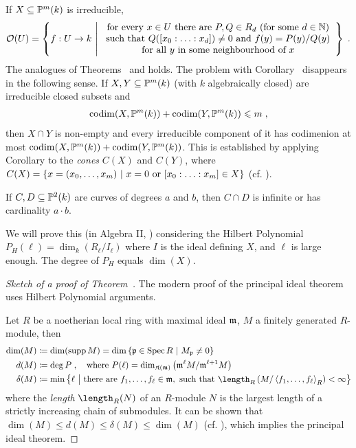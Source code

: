 \documentclass[a4paper,parskip=half,numbers=enddot, DIV=12]{scrreprt}
\renewcommand{\leq}{\leqslant}
\begin{document}
	If $X\subseteq \mathbb{P}^m(k)$ is irreducible,
	\begin{align*}
		\mathcal{O}(U) = \left\{f: U\to k\ \middle|\  
		\begin{array}{c}
			\text{for every } x\in U \text{ there are } P, Q\in R_d \text{ (for some }d\in\mathbb{N})\\
			\text{such that } Q([x_0:\ldots:x_d]) \not=0\text{ and }f(y)=P(y)/Q(y)  \\
			 \text{for all }y\text{ in some neighbourhood of } x
		\end{array}\right\}\;.
	\end{align*}
	The analogues of Theorems~ and  holds. The problem with Corollary~ disappears in the following sense. If $X,Y\subseteq \mathbb{P}^m(k)$ (with $k$ algebraically closed) are irreducible closed subsets and 
	\begin{align*}
		\codim(X,\IP^m(k))+\codim(Y,\IP^m(k)) \leq m\;, 
	\end{align*}
	then $X\cap Y$ is non-empty and every irreducible component of it has codimenion at most $\operatorname{codim}(X,\mathbb{P}^m(k)) +\operatorname{codim}(Y,\mathbb{P}^m(k))$. This is established by applying Corollary  to the \emph{cones} $C(X)$ and $C(Y)$, where $C(X) = \left\{x=(x_0,\ldots,x_m) \ \middle|\  x= 0\text{ or }[x_0:\ldots:x_m]\in X\right\}$ (cf. \cite[Theorem~16]{alg2}).
	\begin{thm}[Bezout]
		If $C,D\subseteq \mathbb{P}^2(k)$ are curves of degrees $a$ and $b$, then $C\cap D$ is infinite or has cardinality $a\cdot b$.
	\end{thm}
	We will prove this (in Algebra II, \cite[Theorem~19]{alg2}) considering the Hilbert Polynomial $P_H(\ell) = \dim_k (R_\ell/I_\ell)$ where $I$ is the ideal defining $X$, and $\ell$ is large enough. The degree of $P_H$ equals $\dim (X)$.
	
	\begin{proof}[Sketch of a proof of Theorem~]
		The modern proof of the principal ideal theorem uses Hilbert Polynomial arguments.
		
		Let $R$ be a noetherian local ring with maximal ideal $\mathfrak{m}$, $M$ a finitely generated $R$-module, then
		\begin{align*}
		\dim (M)&\coloneqq  \dim( \operatorname{supp} M) = \dim \left\{\pp\in \Spec R\st M_\pp\neq 0\right\}\\
		d(M) &\coloneqq \deg P\;,\quad\text{where }  P(\ell)=  \dim_{\KK(\mm)} \left(\mm^\ell M /\mm^{\ell+1}M\right)\\
		\delta(M) &\coloneqq \min\big\{\ell\ \big|\ \text{there are } f_1,\ldots,f_\ell\in \mm, \text{ such that } \length_R\left(M/\left\langle f_1,\ldots,f_\ell\right\rangle_R\right)<\infty\big\}
		\end{align*}
		where the \emph{length} $\length_R(N)$ of an $R$-module $N$ is the largest length of a strictly increasing chain of submodules. It can be shown that $\dim (M) \leq d(M)\leq  \delta(M)\leq \dim (M)$ (cf. \cite[Theorem~20]{alg2}), which implies the principal ideal theorem.
	\end{proof}
	
\end{document}
